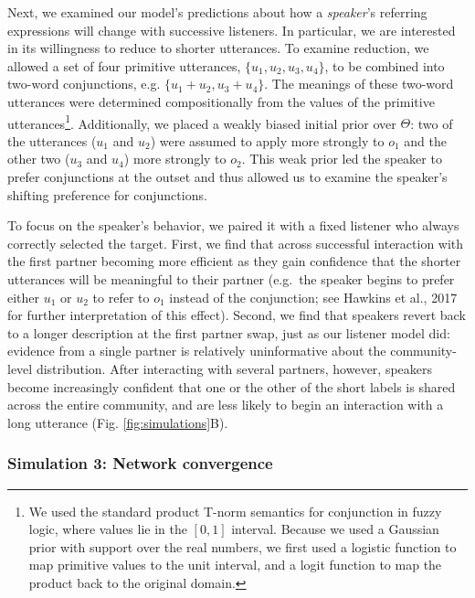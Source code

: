 \documentclass[10pt, letterpaper]{article}
\begin{document}
Next, we examined our model's predictions about how a \emph{speaker}'s
referring expressions will change with successive listeners. In
particular, we are interested in its willingness to reduce to shorter
utterances. To examine reduction, we allowed a set of four primitive
utterances, \(\{u_1, u_2, u_3, u_4\}\), to be combined into two-word
conjunctions, e.g. \(\{u_1+u_2, u_3+u_4\}\). The meanings of these
two-word utterances were determined compositionally from the values of
the primitive utterances\footnote{We used the standard product T-norm
  semantics for conjunction in fuzzy logic, where values lie in the
  \([0,1]\) interval. Because we used a Gaussian prior with support over
  the real numbers, we first used a logistic function to map primitive
  values to the unit interval, and a logit function to map the product
  back to the original domain.}. Additionally, we placed a weakly biased
initial prior over \(\Theta\): two of the utterances (\(u_1\) and
\(u_2\)) were assumed to apply more strongly to \(o_1\) and the other
two (\(u_3\) and \(u_4\)) more strongly to \(o_2\). This weak prior led
the speaker to prefer conjunctions at the outset and thus allowed us to
examine the speaker's shifting preference for conjunctions.

To focus on the speaker's behavior, we paired it with a fixed listener
who always correctly selected the target. First, we find that across
successful interaction with the first partner becoming more efficient as
they gain confidence that the shorter utterances will be meaningful to
their partner (e.g.~the speaker begins to prefer either \(u_1\) or
\(u_2\) to refer to \(o_1\) instead of the conjunction; see Hawkins et
al., 2017 for further interpretation of this effect). Second, we find
that speakers revert back to a longer description at the first partner
swap, just as our listener model did: evidence from a single partner is
relatively uninformative about the community-level distribution. After
interacting with several partners, however, speakers become increasingly
confident that one or the other of the short labels is shared across the
entire community, and are less likely to begin an interaction with a
long utterance (Fig. \ref{fig:simulations}B).

\hypertarget{simulation-3-network-convergence}{%
\subsubsection{Simulation 3: Network
convergence}\label{simulation-3-network-convergence}}
\end{document}
